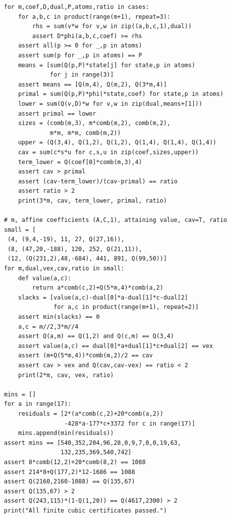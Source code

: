 \noindent\begin{minipage}{\textwidth}\small
\begin{verbatim}
for m,coef,D,dual,P,atoms,ratio in cases:
    for a,b,c in product(range(m+1), repeat=3):
        rhs = sum(v*w for v,w in zip((a,b,c,1),dual))
        assert D*phi(a,b,c,coef) >= rhs
    assert all(p >= 0 for _,p in atoms)
    assert sum(p for _,p in atoms) == P
    means = [sum(Q(p,P)*state[j] for state,p in atoms)
             for j in range(3)]
    assert means == [Q(m,4), Q(m,2), Q(3*m,4)]
    primal = sum(Q(p,P)*phi(*state,coef) for state,p in atoms)
    lower = sum(Q(v,D)*w for v,w in zip(dual,means+[1]))
    assert primal == lower
    sizes = (comb(m,3), m*comb(m,2), comb(m,2),
             m*m, m*m, comb(m,2))
    upper = (Q(3,4), Q(1,2), Q(1,2), Q(1,4), Q(1,4), Q(1,4))
    cav = sum(c*s*u for c,s,u in zip(coef,sizes,upper))
    term_lower = Q(coef[0]*comb(m,3),4)
    assert cav > primal
    assert (cav-term_lower)/(cav-primal) == ratio
    assert ratio > 2
    print(3*m, cav, term_lower, primal, ratio)

# m, affine coefficients (A,C,1), attaining value, cav=T, ratio
small = [
 (4, (9,4,-19), 11, 27, Q(27,16)),
 (8, (47,20,-188), 120, 252, Q(21,11)),
 (12, (Q(231,2),48,-684), 441, 891, Q(99,50))]
for m,dual,vex,cav,ratio in small:
    def value(a,c):
        return a*comb(c,2)+Q(5*m,4)*comb(a,2)
    slacks = [value(a,c)-dual[0]*a-dual[1]*c-dual[2]
              for a,c in product(range(m+1), repeat=2)]
    assert min(slacks) == 0
    a,c = m//2,3*m//4
    assert Q(a,m) == Q(1,2) and Q(c,m) == Q(3,4)
    assert value(a,c) == dual[0]*a+dual[1]*c+dual[2] == vex
    assert (m+Q(5*m,4))*comb(m,2)/2 == cav
    assert cav > vex and Q(cav,cav-vex) == ratio < 2
    print(2*m, cav, vex, ratio)

mins = []
for a in range(17):
    residuals = [2*(a*comb(c,2)+20*comb(a,2))
                 -428*a-177*c+3372 for c in range(17)]
    mins.append(min(residuals))
assert mins == [540,352,204,96,28,0,9,7,0,0,19,63,
                132,235,369,540,742]
assert 8*comb(12,2)+20*comb(8,2) == 1088
assert 214*8+Q(177,2)*12-1686 == 1088
assert Q(2160,2160-1088) == Q(135,67)
assert Q(135,67) > 2
assert Q(243,115)*(1-Q(1,20)) == Q(4617,2300) > 2
print("All finite cubic certificates passed.")
\end{verbatim}
\end{minipage}
